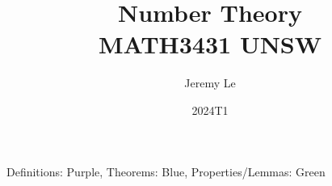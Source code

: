 \documentclass[12pt, letterpaper]{article}
\title{Number Theory \\ MATH3431 UNSW}
\author{Jeremy Le}
\date{2024T1}
\begin{document}
\maketitle

Definitions: Purple, Theorems: Blue, Properties/Lemmas: Green
\tableofcontents
\newpage







\end{document}

